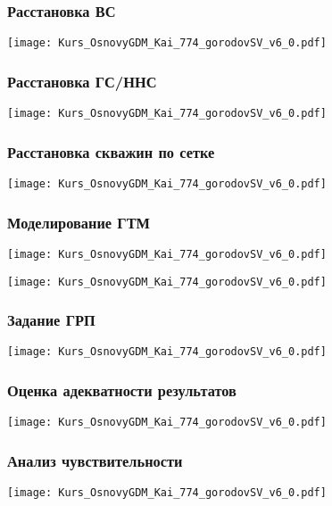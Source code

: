 \documentclass[main.tex]{subfiles}
\begin{document}
\subsubsection{Расстановка ВС}

\texttt{[image: Kurs\_OsnovyGDM\_Kai\_774\_gorodovSV\_v6\_0.pdf]}

\subsubsection{Расстановка ГС/ННС}

\texttt{[image: Kurs\_OsnovyGDM\_Kai\_774\_gorodovSV\_v6\_0.pdf]}

\subsubsection{Расстановка скважин по сетке}

\texttt{[image: Kurs\_OsnovyGDM\_Kai\_774\_gorodovSV\_v6\_0.pdf]}

\subsubsection{Моделирование ГТМ}

\texttt{[image: Kurs\_OsnovyGDM\_Kai\_774\_gorodovSV\_v6\_0.pdf]}

\texttt{[image: Kurs\_OsnovyGDM\_Kai\_774\_gorodovSV\_v6\_0.pdf]}

\subsubsection{Задание ГРП}

\texttt{[image: Kurs\_OsnovyGDM\_Kai\_774\_gorodovSV\_v6\_0.pdf]}

\subsubsection{Оценка адекватности результатов}

\texttt{[image: Kurs\_OsnovyGDM\_Kai\_774\_gorodovSV\_v6\_0.pdf]}

\subsubsection{Анализ чувствительности}

\texttt{[image: Kurs\_OsnovyGDM\_Kai\_774\_gorodovSV\_v6\_0.pdf]}
\end{document}
